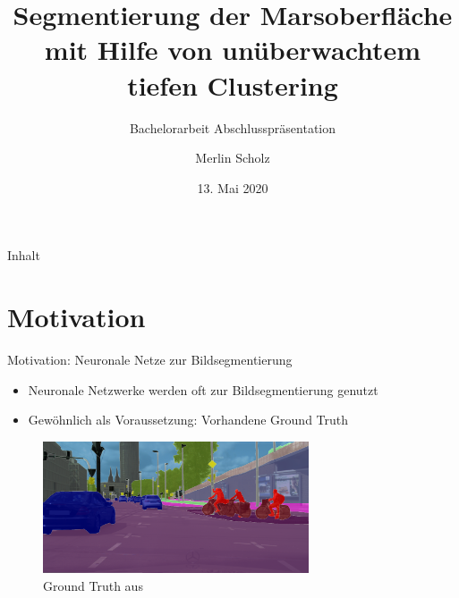 \documentclass{beamer}
\title{Segmentierung der Marsoberfläche mit Hilfe von unüberwachtem tiefen Clustering}
\subtitle{Bachelorarbeit Abschlusspräsentation}
\author{Merlin Scholz}
\date{13. Mai 2020}
\institute[TU Dortmund]{Mustererkennung,\\ Informatik XII, Technische Universität Dortmund}
\begin{document}
\maketitle

\begin{frame}{Inhalt}
\tableofcontents
\end{frame}


\section{Motivation}
\begin{frame}{Motivation: Neuronale Netze zur Bildsegmentierung}
\begin{itemize}
	\item Neuronale Netzwerke werden oft zur Bildsegmentierung genutzt
	\item Gewöhnlich als Voraussetzung: Vorhandene Ground Truth
\end{itemize}
	\begin{figure}[h!]
		\includegraphics[width=0.7\textwidth,keepaspectratio]{gfx/koeln00.png}
		\caption{Ground Truth aus \cite{cityscapes}}
	\end{figure}
\end{frame}
\end{document}
